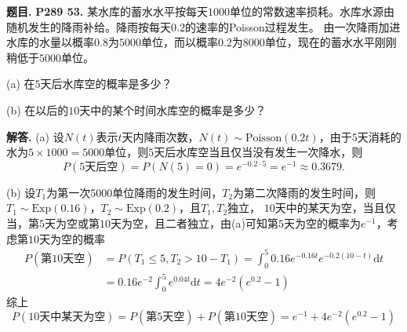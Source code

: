 \documentclass[12pt, a4paper, oneside]{ctexart}
\newcounter{problem}  %
\newenvironment{problem}[1][]{\stepcounter{problem}\par\noindent\textbf{题目\arabic{problem}. #1}}{\smallskip\par}
\newenvironment{solution}[1][]{\par\noindent\textbf{#1解答. }}{\smallskip\par}  %
\def\d{\mathrm{d}}          %
\begin{document}
\begin{problem}
    \textbf{P289 53.}
    某水库的蓄水水平按每天$1000$单位的常数速率损耗。水库水源由随机发生的降雨补给。降雨按每天$0.2$的速率的Poisson过程发生。
    由一次降雨加进水库的水量以概率$0.8$为$5000$单位，而以概率$0.2$为$8000$单位，现在的蓄水水平刚刚稍低于$5000$单位。

    (a) 在$5$天后水库空的概率是多少？

    (b) 在以后的$10$天中的某个时间水库空的概率是多少？
\end{problem}
\begin{solution}
(a) 设$N(t)$表示$t$天内降雨次数，$N(t)\sim \mathrm{Poisson}(0.2t)$，由于$5$天消耗的水为$5\times 1000 = 5000$单位，则$5$天后水库空当且仅当没有发生一次降水，则
\begin{equation*}
    P(\text{5天后空}) = P(N(5) = 0) = e^{-0.2 \cdot 5} = e^{-1} \approx 0.3679.
\end{equation*}

(b) 设$T_1$为第一次5000单位降雨的发生时间，$T_2$为第二次降雨的发生时间，则$T_1\sim\text{Exp}(0.16)$，$T_2\sim\text{Exp}(0.2)$，且$T_1,T_2$独立，
$10$天中的某天为空，当且仅当，第$5$天为空或第$10$天为空，且二者独立，由(a)可知第$5$天为空的概率为$e^{-1}$，考虑第$10$天为空的概率
\begin{align*}
    P(\text{第10天空}) &= P(T_1\leqslant 5, T_2 > 10 - T_1) = \int_0^5 0.16e^{-0.16t}e^{-0.2(10-t)}\d t \\
    &= 0.16e^{-2}\int_0^5 e^{0.04t}\d t = 4e^{-2}\left(e^{0.2}-1\right)
\end{align*}
综上
\begin{equation*}
    P(\text{10天中某天为空}) = P(\text{第5天空}) + P(\text{第10天空}) = e^{-1} + 4e^{-2}(e^{0.2}-1)
\end{equation*}
\end{solution}
\end{document}
